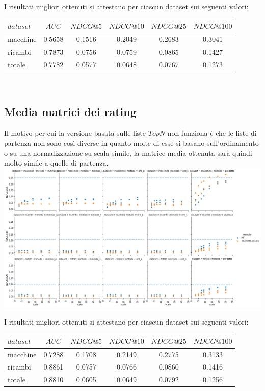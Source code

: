 I risultati migliori ottenuti si attestano per ciascun dataset sui seguenti valori:\\

\begin{tabular}{|l|ccccc|}
    \toprule
    $dataset$ & $AUC$ & $NDCG@5$ & $NDCG@10$  & $NDCG@25$ & $NDCG@100$  \\
    \midrule
    macchine & 0.5658   &0.1516 & 0.2049 & 0.2683 & 0.3041 \\
    ricambi &  0.7873  &0.0756 & 0.0759 & 0.0865 & 0.1427 \\
    totale  & 0.7782   &0.0577 & 0.0648 & 0.0767 & 0.1273 \\
\bottomrule
\end{tabular}\\


\subsection{Media matrici dei rating}
Il motivo per cui la versione basata sulle liste $TopN$ non funziona è che le liste di partenza non sono così diverse in quanto molte di esse si basano sull'ordinamento o su una normalizzazione su scala simile, la matrice media ottenuta sarà quindi molto simile a quelle di partenza.\\

\includegraphics[width=16cm]{figures/comb_2.png}

I risultati migliori ottenuti si attestano per ciascun dataset sui seguenti valori:\\

\begin{tabular}{|l|ccccc|}
    \toprule
    $dataset$  & $AUC$ & $NDCG@5$ & $NDCG@10$  & $NDCG@25$ & $NDCG@100$  \\
    \midrule
    macchine & 0.7288 & 0.1708 & 0.2149 & 0.2775 & 0.3133 \\
    ricambi & 0.8861  & 0.0757 & 0.0766 & 0.0860 & 0.1416 \\
    totale  & 0.8810  & 0.0605 & 0.0649 & 0.0792 & 0.1256 \\
\bottomrule
\end{tabular}\\

